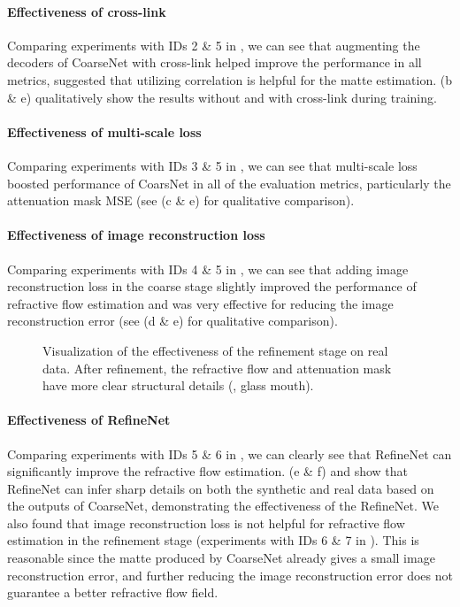 \paragraph{Effectiveness of cross-link} Comparing experiments with IDs 2 \& 5 in , we can see that augmenting the decoders of CoarseNet with cross-link helped improve the performance in all metrics, suggested that utilizing correlation is helpful for the matte estimation.
 (b \& e) qualitatively show the results without and with cross-link during training.

\paragraph{Effectiveness of multi-scale loss} Comparing experiments with IDs 3 \& 5 in , we can see that multi-scale loss boosted performance of CoarsNet in all of the evaluation metrics, particularly the attenuation mask MSE (see  (c \& e) for qualitative comparison).

\paragraph{Effectiveness of image reconstruction loss} Comparing experiments with IDs 4 \& 5 in , we can see that adding image reconstruction loss in the coarse stage slightly improved the performance of refractive flow estimation and was very effective for reducing the image reconstruction error (see  (d \& e) for qualitative comparison).

\begin{figure}[tbp] \centering
    
    \caption[Visualization of the effectiveness of the refinement stage on real data]{Visualization of the effectiveness of the refinement stage on real data. After refinement, the refractive flow and attenuation mask have more clear structural details (\eg, glass mouth).} \label{fig:refine}
\end{figure}

\paragraph{Effectiveness of RefineNet}
Comparing experiments with IDs 5 \& 6 in , we can clearly see that RefineNet can significantly improve the refractive flow estimation.  (e \& f) and  show that RefineNet can infer sharp details on both the synthetic and real data based on the outputs of CoarseNet, demonstrating the effectiveness of the RefineNet. We also found that image reconstruction loss is not helpful for refractive flow estimation in the refinement stage (experiments with IDs 6 \& 7 in ). This is reasonable since the matte produced by CoarseNet already gives a small image reconstruction error, and further reducing the image reconstruction error does not guarantee a better refractive flow field. 

